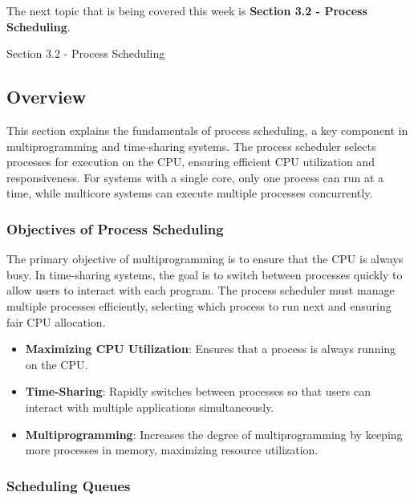 The next topic that is being covered this week is \textbf{Section 3.2 - Process Scheduling}.

\begin{notes}{Section 3.2 - Process Scheduling}
    \subsection*{Overview}

    This section explains the fundamentals of process scheduling, a key component in multiprogramming and time-sharing systems. The process scheduler selects processes for execution on the CPU, ensuring 
    efficient CPU utilization and responsiveness. For systems with a single core, only one process can run at a time, while multicore systems can execute multiple processes concurrently.
    
    \subsubsection*{Objectives of Process Scheduling}
    
    The primary objective of multiprogramming is to ensure that the CPU is always busy. In time-sharing systems, the goal is to switch between processes quickly to allow users to interact with each 
    program. The process scheduler must manage multiple processes efficiently, selecting which process to run next and ensuring fair CPU allocation.
    
    \begin{highlight}
    
        \begin{itemize}
            \item \textbf{Maximizing CPU Utilization}: Ensures that a process is always running on the CPU.
            \item \textbf{Time-Sharing}: Rapidly switches between processes so that users can interact with multiple applications simultaneously.
            \item \textbf{Multiprogramming}: Increases the degree of multiprogramming by keeping more processes in memory, maximizing resource utilization.
        \end{itemize}
    
    \end{highlight}
    
    \subsubsection*{Scheduling Queues}
    

\end{notes}
